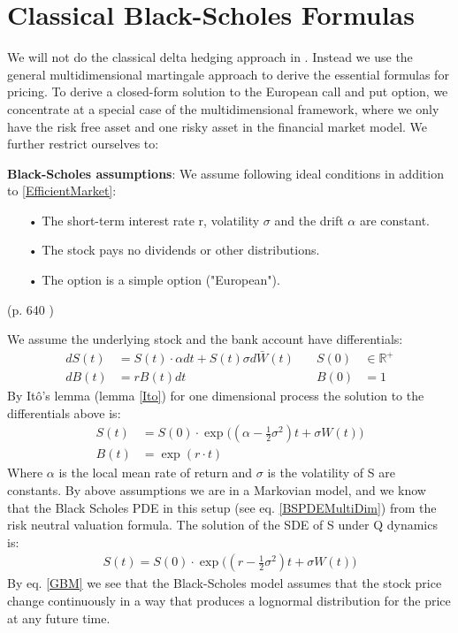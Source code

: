 \section{Classical Black-Scholes Formulas}\label{classicBS}
We will not do the classical delta hedging approach in \parencite{B-S-Paper}. Instead we use the general multidimensional martingale approach to derive the essential formulas for pricing. 
To derive a closed-form solution to the European call and put option, we concentrate at a special case of the multidimensional framework, where we only have the risk free asset and one risky asset in the financial market model. 
We further restrict ourselves to:
\theoremstyle{assumption}
\begin{assumption}{\textbf{Black-Scholes assumptions}:}\label{BS-Assumption}
We assume following ideal conditions in addition to \eqref{EfficientMarket}:
\begin{enumerate}
\item[•] The short-term interest rate r, volatility $\sigma$ and the drift $\alpha$ are constant.
\item[•] The stock pays no dividends or other distributions.
\item[•] The option is a simple option ("European").
\end{enumerate}
(p. 640 \parencite{B-S-Paper})
\end{assumption}

We assume the underlying stock and the bank account have differentials:
\begin{align}
dS(t)&=S(t)\cdot \alpha dt+S(t) \sigma d\bar{W}(t) \quad & S(0) &\in \mathbb{R}^+ \\
dB(t)&=r B(t)dt \quad & B(0) &= 1
\end{align}
By Itô's lemma (lemma \ref{Ito}) for one dimensional process the solution to the differentials above is:
\begin{align}
S(t)&=S(0) \cdot \exp \bigg( (\alpha -\frac{1}{2} \sigma^2) t + \sigma W(t) \bigg) \\
B(t)&=\exp(r\cdot t)
\end{align}
Where $\alpha$ is the local mean rate of return and $\sigma$ is the volatility of S are constants. By above assumptions we are in a Markovian model, and we know that the Black Scholes PDE in this setup (see eq.  \ref{BSPDEMultiDim}) from the risk neutral valuation formula. The solution of the SDE of S under Q dynamics is:
\begin{equation}\label{GBM}
\begin{split}
S(t)=S(0) \cdot \exp \bigg( (r -\frac{1}{2} \sigma^2) t + \sigma W(t) \bigg)
\end{split}
\end{equation}
By eq. \eqref{GBM} we see that the Black-Scholes model assumes that the stock price change continuously in a way that produces a lognormal distribution for the price at any future time. \\

